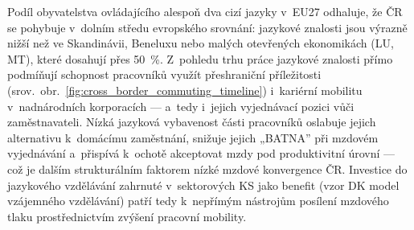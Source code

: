 Podíl obyvatelstva ovládajícího alespoň dva cizí jazyky v~EU27 odhaluje, že ČR se pohybuje v~dolním středu evropského srovnání: jazykové znalosti jsou výrazně nižší než ve Skandinávii, Beneluxu nebo malých otevřených ekonomikách (LU, MT), které dosahují přes \SI{50}{\percent}.
Z~pohledu trhu práce jazykové znalosti přímo podmíňují schopnost pracovníků využít přeshraniční příležitosti (srov.~obr.~\ref{fig:cross_border_commuting_timeline}) i~kariérní mobilitu v~nadnárodních korporacích --- a~tedy i~jejich vyjednávací pozici vůči zaměstnavateli.
Nízká jazyková vybavenost části pracovníků oslabuje jejich alternativu k~domácímu zaměstnání, snižuje jejich „BATNA” při mzdovém vyjednávání a~přispívá k~ochotě akceptovat mzdy pod produktivitní úrovní --- což je dalším strukturálním faktorem nízké mzdové konvergence ČR.
Investice do jazykového vzdělávání zahrnuté v~sektorových \ac{KS} jako benefit (vzor DK model vzájemného vzdělávání) patří tedy k~nepřímým nástrojům posílení mzdového tlaku prostřednictvím zvýšení pracovní mobility.


